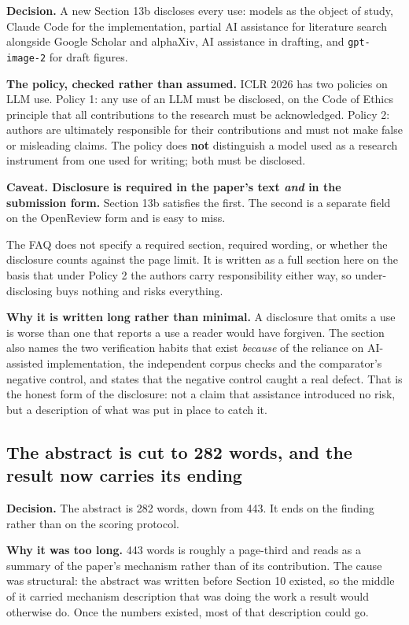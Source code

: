 \textbf{Decision.} A new Section 13b discloses every use: models as the object of study, Claude Code
for the implementation, partial AI assistance for literature search alongside Google Scholar and
alphaXiv, AI assistance in drafting, and \texttt{gpt-image-2} for draft figures.

\textbf{The policy, checked rather than assumed.} ICLR 2026 has two policies on LLM use. Policy 1:
any use of an LLM must be disclosed, on the Code of Ethics principle that all contributions to the
research must be acknowledged. Policy 2: authors are ultimately responsible for their contributions
and must not make false or misleading claims. The policy does \textbf{not} distinguish a model used
as a research instrument from one used for writing; both must be disclosed.

\textbf{Caveat. Disclosure is required in the paper's text \emph{and} in the submission form.}
Section 13b satisfies the first. The second is a separate field on the OpenReview form and is easy
to miss.

The FAQ does not specify a required section, required wording, or whether the disclosure counts
against the page limit. It is written as a full section here on the basis that under Policy 2 the
authors carry responsibility either way, so under-disclosing buys nothing and risks everything.

\textbf{Why it is written long rather than minimal.} A disclosure that omits a use is worse than one
that reports a use a reader would have forgiven. The section also names the two verification habits
that exist \emph{because} of the reliance on AI-assisted implementation, the independent corpus
checks and the comparator's negative control, and states that the negative control caught a real
defect. That is the honest form of the disclosure: not a claim that assistance introduced no risk,
but a description of what was put in place to catch it.

\subsection{The abstract is cut to 282 words, and the result now carries its ending}

\textbf{Decision.} The abstract is 282 words, down from 443. It ends on the finding rather than on
the scoring protocol.

\textbf{Why it was too long.} 443 words is roughly a page-third and reads as a summary of the
paper's mechanism rather than of its contribution. The cause was structural: the abstract was
written before Section 10 existed, so the middle of it carried mechanism description that was doing
the work a result would otherwise do. Once the numbers existed, most of that description could go.


